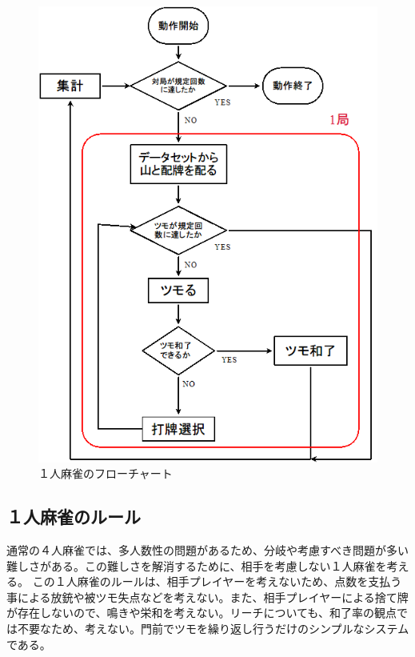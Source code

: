 \begin{figure}[H]
 \centering
 \includegraphics[keepaspectratio, scale=0.7,bb=0 0 440 540]
      {img/1flow.png}
 \caption{１人麻雀のフローチャート}
 \label{1flow}
\end{figure}




\subsection{１人麻雀のルール}
通常の４人麻雀では、多人数性の問題があるため、分岐や考慮すべき問題が多い難しさがある。この難しさを解消するために、相手を考慮しない１人麻雀を考える。
この１人麻雀のルールは、相手プレイヤーを考えないため、点数を支払う事による放銃や被ツモ失点などを考えない。また、相手プレイヤーによる捨て牌が存在しないので、鳴きや栄和を考えない。リーチについても、和了率の観点では不要なため、考えない。門前でツモを繰り返し行うだけのシンプルなシステムである。

